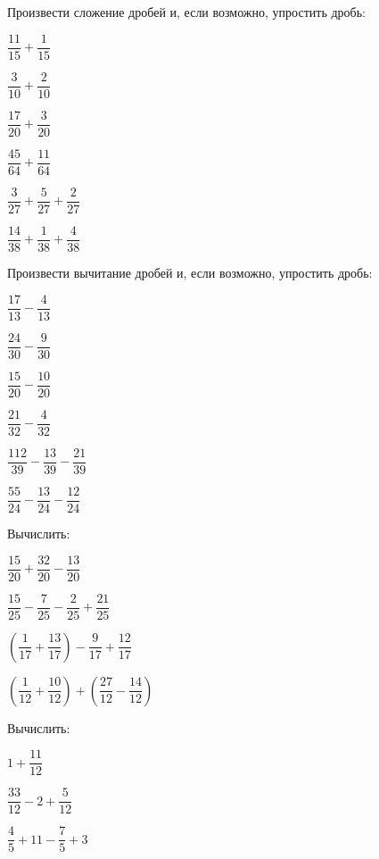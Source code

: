 \begin{listofex}
	\item Произвести сложение дробей и, если возможно, упростить дробь:
	\begin{enumcols}[itemcolumns=3]
		\item \( \dfrac{11}{15}+\dfrac{1}{15} \)
		\item \( \dfrac{3}{10}+\dfrac{2}{10} \)
		\item \( \dfrac{17}{20}+\dfrac{3}{20} \)
		\item \( \dfrac{45}{64}+\dfrac{11}{64} \)
		\item \( \dfrac{3}{27}+\dfrac{5}{27}+\dfrac{2}{27} \)
		\item \( \dfrac{14}{38}+\dfrac{1}{38}+\dfrac{4}{38} \)
	\end{enumcols}
	\item Произвести вычитание дробей и, если возможно, упростить дробь:
	\begin{enumcols}[itemcolumns=3]
		\item \( \dfrac{17}{13}-\dfrac{4}{13} \)
		\item \( \dfrac{24}{30}-\dfrac{9}{30} \)
		\item \( \dfrac{15}{20}-\dfrac{10}{20} \)
		\item \( \dfrac{21}{32}-\dfrac{4}{32} \)
		\item \( \dfrac{112}{39}-\dfrac{13}{39}-\dfrac{21}{39} \)
		\item \( \dfrac{55}{24}-\dfrac{13}{24}-\dfrac{12}{24} \)
	\end{enumcols}
	\item Вычислить:
	\begin{enumcols}[itemcolumns=2]
		\item \( \dfrac{15}{20}+\dfrac{32}{20}-\dfrac{13}{20} \)
		\item \( \dfrac{15}{25}-\dfrac{7}{25}-\dfrac{2}{25}+\dfrac{21}{25} \)
		\item \( \left( \dfrac{1}{17}+\dfrac{13}{17} \right)-\dfrac{9}{17}+\dfrac{12}{17} \)
		\item \( \left( \dfrac{1}{12}+\dfrac{10}{12} \right)+\left( \dfrac{27}{12}-\dfrac{14}{12} \right) \)
	\end{enumcols}
	\item Вычислить:
	\begin{enumcols}[itemcolumns=2]
		\item \( 1+\dfrac{11}{12} \)
		\item \( \dfrac{33}{12}-2+\dfrac{5}{12} \)
		\item \( \dfrac{4}{5}+11-\dfrac{7}{5}+3 \)

\end{enumcols}
\end{listofex}
